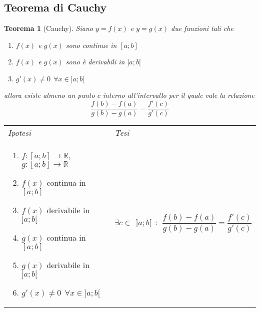 \documentclass{article}     %
\newcommand\R{\mathbb{R}}
\newtheorem*{theorem}{Teorema}
\newenvironment{shadedTheorem}%
  {\begin{mdframed}[backgroundcolor=lightgray!40, linecolor=white, innertopmargin=4pt, innerbottommargin=13pt]\begin{theorem}}%
  {\end{theorem}\end{mdframed}}
\begin{document}
        \subsection{Teorema di Cauchy}
        \begin{shadedTheorem}[Cauchy]
        Siano $y=f(x)$ e $y=g(x)$ due funzioni tali che 
        \begin{enumerate}
            \item $f(x)$ e $g(x)$ sono continue in $[a;b]$
            \item $f(x)$ e $g(x)$ sono è derivabili in $]a;b[$
            \item $g'(x)\neq 0 ~~ \forall x \in ]a;b[$ 
        \end{enumerate}
        allora esiste almeno un punto $c$ interno all'intervallo per il quale vale la relazione \[\frac{f(b)-f(a)}{g(b)-g(a)}=\frac{f'(c)}{g'(c)}\]
        \end{shadedTheorem}
        \begin{tabular}{m{}m{}}
            \textit{Ipotesi} & \textit{Tesi}  \\
            \begin{enumerate}
            \item $f:[a;b] \to \R$, $g: [a;b] \to \R$
            \item $f(x)$ continua in $[a;b]$
            \item $f(x)$ derivabile in $]a;b[$
            \item $g(x)$ continua in $[a;b]$
            \item $g(x)$ derivabile in $]a;b[$
            \item $g'(x)\neq 0 ~~ \forall x \in ]a;b[$
        \end{enumerate} & $\exists c \in~~]a;b[ ~~:~~ \dfrac{f(b)-f(a)}{g(b)-g(a)}=\dfrac{f'(c)}{g'(c)}$
        \end{tabular}
\end{document}
